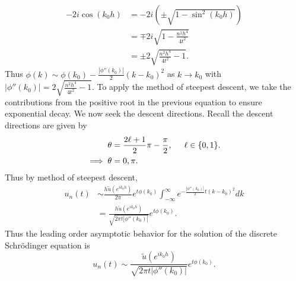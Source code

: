 \documentclass{article}
\begin{document}
\begin{itemize}
    \begin{align*}
        -2i\cos(k_0h) &= -2i\left(\pm\sqrt{1 - \sin^2(k_0h)}\right)\\
        &= \mp 2i\sqrt{1 - \frac{n^2h^4}{4t^2}}\\
        &= \pm2\sqrt{\frac{n^2h^4}{4t^2}-1}.
    \end{align*}
    Thus $\phi(k) \sim \phi(k_0) - \frac{|\phi''(k_0)|}{2}(k - k_0)^2$ as $k \to k_0$ with $|\phi''(k_0)| = 2\sqrt{\frac{n^2h^4}{4t^2}-1}$. To apply the method of steepest descent, we take the contributions from the positive root in the previous equation to ensure exponential decay. We now seek the descent directions. Recall the descent directions are given by
    \begin{align*}
        \theta &= \frac{2\ell + 1}{2}\pi - \frac{\pi}{2}, \hspace{0.5cm} \ell \in \{0,1\}.\\
        \implies \theta&= 0,\pi.
    \end{align*}
    Thus by method of steepest descent, 
    \begin{align*}
        u_n(t) &\sim \frac{h\tilde{u}(e^{ik_0h})}{2\pi}e^{t\phi(k_0)}\int_{-\infty}^{\infty}e^{-\frac{|\phi''(k_0)|}{2}t(k - k_0)^2}dk\\
        &= \frac{h\tilde{u}(e^{ik_0h})}{\sqrt{2\pi t |\phi''(k_0)|}}e^{t\phi(k_0)}.
    \end{align*}
    Thus the leading order asymptotic behavior for the solution of the discrete Schr{\"o}dinger equation is
    \[u_n(t) \sim \frac{\tilde{u}(e^{ik_0h})}{\sqrt{2\pi t |\phi''(k_0)|}}e^{t\phi(k_0)}.\]
\end{itemize}
\end{document}
